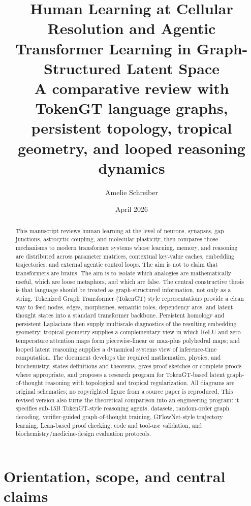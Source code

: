 \documentclass[11pt]{article}
\title{\vspace{-0.5in}\textbf{Human Learning at Cellular Resolution and Agentic Transformer Learning in Graph-Structured Latent Space}\\[0.3em]
\large A comparative review with TokenGT language graphs, persistent topology, tropical geometry, and looped reasoning dynamics}
\author{Amelie Schreiber}
\date{April 2026}
\newcommand{\1}{\mathbf{1}}
\begin{document}
\maketitle

\begin{abstract}
This manuscript reviews human learning at the level of neurons, synapses, gap junctions, astrocytic coupling, and molecular plasticity, then compares those mechanisms to modern transformer systems whose learning, memory, and reasoning are distributed across parameter matrices, contextual key-value caches, embedding trajectories, and external agentic control loops. The aim is not to claim that transformers are brains. The aim is to isolate which analogies are mathematically useful, which are loose metaphors, and which are false. The central constructive thesis is that language should be treated as graph-structured information, not only as a string. Tokenized Graph Transformer (TokenGT) style representations provide a clean way to feed nodes, edges, morphemes, semantic roles, dependency arcs, and latent thought states into a standard transformer backbone. Persistent homology and persistent Laplacians then supply multiscale diagnostics of the resulting embedding geometry; tropical geometry supplies a complementary view in which ReLU and zero-temperature attention maps form piecewise-linear or max-plus polyhedral maps; and looped latent reasoning supplies a dynamical systems view of inference-time computation. The document develops the required mathematics, physics, and biochemistry, states definitions and theorems, gives proof sketches or complete proofs where appropriate, and proposes a research program for TokenGT-based latent graph-of-thought reasoning with topological and tropical regularization. All diagrams are original schematics; no copyrighted figure from a source paper is reproduced. This revised version also turns the theoretical comparison into an engineering program: it specifies sub-15B TokenGT-style reasoning agents, datasets, random-order graph decoding, verifier-guided graph-of-thought training, GFlowNet-style trajectory learning, Lean-based proof checking, code and tool-use validation, and biochemistry/medicine-design evaluation protocols.
\end{abstract}

\tableofcontents
\newpage

\section{Orientation, scope, and central claims}
\end{document}

